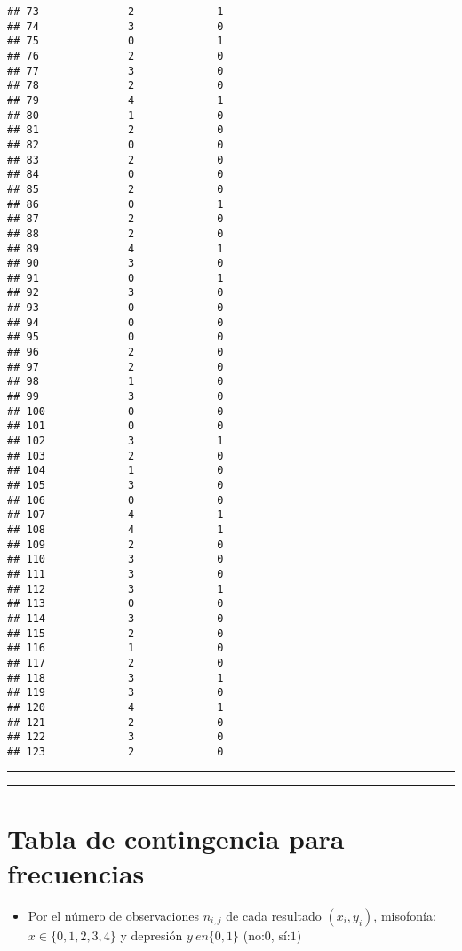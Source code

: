 \documentclass[
]{book}
\providecommand{\tightlist}{%
  \setlength{\itemsep}{0pt}\setlength{\parskip}{0pt}}
\begin{document}
\begin{verbatim}
## 73              2             1
## 74              3             0
## 75              0             1
## 76              2             0
## 77              3             0
## 78              2             0
## 79              4             1
## 80              1             0
## 81              2             0
## 82              0             0
## 83              2             0
## 84              0             0
## 85              2             0
## 86              0             1
## 87              2             0
## 88              2             0
## 89              4             1
## 90              3             0
## 91              0             1
## 92              3             0
## 93              0             0
## 94              0             0
## 95              0             0
## 96              2             0
## 97              2             0
## 98              1             0
## 99              3             0
## 100             0             0
## 101             0             0
## 102             3             1
## 103             2             0
## 104             1             0
## 105             3             0
## 106             0             0
## 107             4             1
## 108             4             1
## 109             2             0
## 110             3             0
## 111             3             0
## 112             3             1
## 113             0             0
## 114             3             0
## 115             2             0
## 116             1             0
## 117             2             0
## 118             3             1
## 119             3             0
## 120             4             1
## 121             2             0
## 122             3             0
## 123             2             0
\end{verbatim}

\begin{center}\rule{0.5\linewidth}{0.5pt}\end{center}

\begin{center}\rule{0.5\linewidth}{0.5pt}\end{center}

\hypertarget{tabla-de-contingencia-para-frecuencias}{%
\section{Tabla de contingencia para frecuencias}\label{tabla-de-contingencia-para-frecuencias}}

\begin{itemize}
\tightlist
\item
  Por el número de observaciones \(n_{i,j}\) de cada resultado \((x_i, y_i)\), misofonía: \(x\in \{0,1,2,3,4\}\) y depresión \(y\ en \{0,1\}\) (no:\(0\), sí:\(1\))
\end{itemize}
\end{document}
